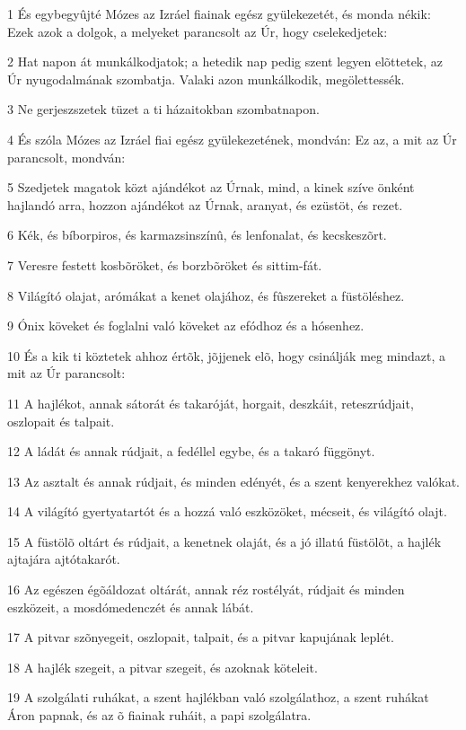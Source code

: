 \par 1 És egybegyûjté Mózes az Izráel fiainak egész gyülekezetét, és monda nékik: Ezek azok a dolgok, a melyeket parancsolt az Úr, hogy cselekedjetek:
\par 2 Hat napon át munkálkodjatok; a hetedik nap pedig szent legyen elõttetek, az Úr nyugodalmának szombatja. Valaki azon munkálkodik, megölettessék.
\par 3 Ne gerjeszszetek tüzet a ti házaitokban szombatnapon.
\par 4 És szóla Mózes az Izráel fiai egész gyülekezetének, mondván: Ez az, a mit az Úr parancsolt, mondván:
\par 5 Szedjetek magatok közt ajándékot az Úrnak, mind, a kinek szíve önként hajlandó arra, hozzon ajándékot az Úrnak, aranyat, és ezüstöt, és rezet.
\par 6 Kék, és bíborpiros, és karmazsinszínû, és lenfonalat, és kecskeszõrt.
\par 7 Veresre festett kosbõröket, és borzbõröket és sittim-fát.
\par 8 Világító olajat, arómákat a kenet olajához, és fûszereket a füstöléshez.
\par 9 Ónix köveket és foglalni való köveket az efódhoz és a hósenhez.
\par 10 És a kik ti köztetek ahhoz értõk, jõjjenek elõ, hogy csinálják meg mindazt, a mit az Úr parancsolt:
\par 11 A hajlékot, annak sátorát és takaróját, horgait, deszkáit, reteszrúdjait, oszlopait és talpait.
\par 12 A ládát és annak rúdjait, a fedéllel egybe, és a takaró függönyt.
\par 13 Az asztalt és annak rúdjait, és minden edényét, és a szent kenyerekhez valókat.
\par 14 A világító gyertyatartót és a hozzá való eszközöket, mécseit, és világító olajt.
\par 15 A füstölõ oltárt és rúdjait, a kenetnek olaját, és a jó illatú füstölõt, a hajlék ajtajára ajtótakarót.
\par 16 Az egészen égõáldozat oltárát, annak réz rostélyát, rúdjait és minden eszközeit, a mosdómedenczét és annak lábát.
\par 17 A pitvar szõnyegeit, oszlopait, talpait, és a pitvar kapujának leplét.
\par 18 A hajlék szegeit, a pitvar szegeit, és azoknak köteleit.
\par 19 A szolgálati ruhákat, a szent hajlékban való szolgálathoz, a szent ruhákat Áron papnak, és az õ fiainak ruháit, a papi szolgálatra.
